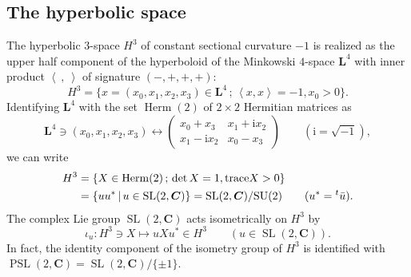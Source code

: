 \documentclass[a4paper]{amsart}
\theoremstyle{plain}
\theoremstyle{remark}
\numberwithin{equation}{section}
\begin{document}
\subsection*{The hyperbolic space}
The hyperbolic $3$-space $H^3$ of constant sectional curvature 
$-1$ is realized as the upper half component of the hyperboloid
of the Minkowski $4$-space ${\boldsymbol{L}}^4$ with 
inner product ${\left\langle{{~}},{{~}}\right\rangle}$ of signature $(-,+,+,+)$:
\begin{equation}\label{eq:hyp-lor}
   H^3 =\{
         x= (x_0,x_1,x_2,x_3)\in{\boldsymbol{L}}^4\,;\,
         {\left\langle{{x}},{{x}}\right\rangle}=-1,
         x_0>0\}.
\end{equation}
Identifying ${\boldsymbol{L}}^4$ with the set ${\operatorname{Herm}}(2)$ of $2\times 2$ Hermitian
matrices as
\begin{equation}\label{eq:lor-herm}
    {\boldsymbol{L}}^4\ni (x_0,x_1,x_2,x_3) \longleftrightarrow
   \begin{pmatrix}
     x_0 + x_ 3 & x_1 + {\mathrm{i}} x_2 \\
     x_1 - {\mathrm{i}} x_2  & x_0 - x_3
   \end{pmatrix}
   \qquad \left({\mathrm{i}}=\sqrt{-1}\right), 
\end{equation}
we can write
\begin{align}
  H^3 &= 
        \{X\in{\operatorname{Herm}}(2)\,;\,\det X=1,{\operatorname{trace}} X>0\} 
 \label{eq:hyp-mat}
 \\
      &= \{ uu^{*}\,|\,u\in{\operatorname{SL}}(2,{\boldsymbol{C}})\} = {\operatorname{SL}}(2,{\boldsymbol{C}})/{\operatorname{SU}}(2)
 \qquad (u^*={{\vphantom{{\bar{u}}}}^t{\bar{u}}}).
 \nonumber
\end{align}
The complex Lie group ${\operatorname{SL}}(2,{\boldsymbol{C}})$ acts isometrically on $H^3$ 
by 
\begin{equation}\label{eq:isometry}
    \iota_{u}\colon{} H^3 \ni X 
              \longmapsto u X u^* \in H^3
    \qquad (u\in{\operatorname{SL}}(2,{\boldsymbol{C}})).
\end{equation}
In fact, the identity component of the isometry group of $H^3$ 
is identified with ${\operatorname{PSL}}(2,{\boldsymbol{C}})={\operatorname{SL}}(2,{\boldsymbol{C}})/\{\pm 1\}$.
\end{document}
